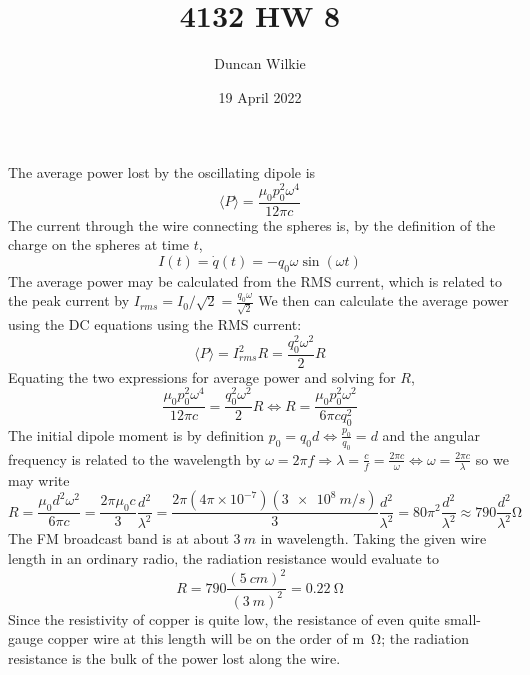 \documentclass{article}
\title{4132 HW 8}
\author{Duncan Wilkie}
\date{19 April 2022}
\begin{document}
\maketitle

\section{}
The average power lost by the oscillating dipole is
\[\langle P \rangle=\frac{\mu_{0}p_{0}^{2}\omega^{4}}{12\pi c}\]
The current through the wire connecting the spheres is, by the definition of the charge on the spheres at time $t$,
\[I(t)=\dot{q}(t)=-q_{0}\omega\sin(\omega t)\]
The average power may be calculated from the RMS current, which is related to the peak current by
$I_{rms}=I_{0}/\sqrt{2}=\frac{q_{0}\omega}{\sqrt{2}}$
We then can calculate the average power using the DC equations using the RMS current:
\[\langle P \rangle=I_{rms}^{2}R=\frac{q_{0}^{2}\omega^{2}}{2}R\]
Equating the two expressions for average power and solving for $R$,
\[
  \frac{\mu_{0}p_{0}^{2}\omega^{4}}{12\pi c}=\frac{q_{0}^{2}\omega^{2}}{2}R
  \Leftrightarrow R=\frac{\mu_{0}p_{0}^{2}\omega^{2}}{6\pi c q_{0}^{2}}
\]
The initial dipole moment is by definition $p_{0}=q_{0}d\Leftrightarrow \frac{p_{0}}{q_{0}}=d$
and the angular frequency is related to the wavelength by
$\omega=2\pi f\Rightarrow \lambda = \frac{c}{f}=\frac{2\pi c}{\omega}\Leftrightarrow \omega=\frac{2\pi c}{\lambda}$
so we may write
\[
  R=\frac{\mu_{0}d^{2}\omega^{2}}{6\pi c}
  =\frac{2\pi\mu_{0}c}{3}\frac{d^{2}}{\lambda^{2}}
  =\frac{2\pi(4\pi\times 10^{-7})(\SI{3e8}{m/s})}{3}\frac{d^{2}}{\lambda^{2}}
  =80\pi^{2}\frac{d^{2}}{\lambda^{2}}\approx 790\frac{d^{2}}{\lambda^{2}}\si{\ohm}
\]
The FM broadcast band is at about $\SI{3}{m}$ in wavelength.
Taking the given wire length in an ordinary radio, the radiation resistance would evaluate to
\[
  R=790\frac{(\SI{5}{cm})^{2}}{(\SI{3}{m})^{2}}=\SI{0.22}{\ohm}
\]
Since the resistivity of copper is quite low, the resistance of even quite small-gauge copper wire at this length will be on the order of
\si{m\ohm}; the radiation resistance is the bulk of the power lost along the wire.
\end{document}
